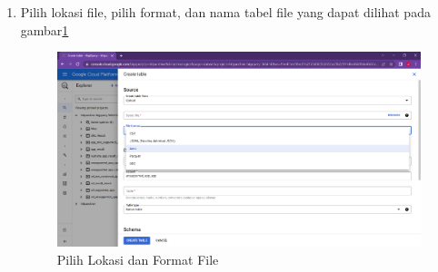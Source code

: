 \begin{enumerate}
	\item Pilih lokasi file, pilih format, dan nama tabel file yang dapat dilihat pada gambar\ref{fig:upload3}
	\begin{figure}[H]
		\centering  
		\includegraphics[scale=0.35]{Gambar/upload_step_3.png}  
		\caption{Pilih Lokasi dan Format File} 
		\label{fig:upload3}
	\end{figure}
\end{enumerate}


